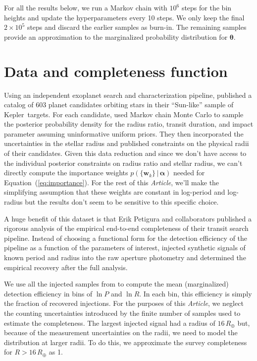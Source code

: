 \documentclass[12pt,preprint]{aastex}
\newcommand{\project}[1]{{\sffamily #1}}
\newcommand{\kepler}{\project{Kepler}}
\newcommand{\paper}{\textsl{Article}}
\newcommand{\Eq}[1]{Equation~(\ref{eq:#1})}
\newcommand{\eq}[1]{\Eq{#1}}
\newcommand{\sectlabel}[1]{\label{sect:#1}}
\newcommand{\bvec}[1]{\ensuremath{\boldsymbol{#1}}}
\newcommand{\ratepar}{{\ensuremath{\theta}}}
\newcommand{\ratepars}{{\ensuremath{\bvec{\ratepar}}}}
\newcommand{\radius}{\ensuremath{R}}
\newcommand{\period}{\ensuremath{P}}
\newcommand{\entry}{{\ensuremath{\bvec{w}}}}
\newcommand{\interim}{{\ensuremath{\bvec{\alpha}}}}
\begin{document}
For all the results below, we run a Markov chain with $10^6$ steps for the bin
heights and update the hyperparameters every 10 steps.
We only keep the final $2 \times 10^5$ steps and discard the earlier samples
as burn-in.
The remaining samples provide an approximation to the marginalized probability
distribution for \ratepars.

\section{Data and completeness function}
\sectlabel{data}

Using an independent exoplanet search and characterization pipeline,
\citet{petigura} published a catalog of 603 planet candidates orbiting stars
in their ``Sun-like'' sample of \kepler\ targets.
For each candidate, \citet{petigura} used Markov chain Monte Carlo to sample
the posterior probability density for the radius ratio, transit duration, and
impact parameter assuming uninformative uniform priors.
They then incorporated the uncertainties in the stellar radius and published
constraints on the physical radii of their candidates.
Given this data reduction and since we don't have access to the individual
posterior constraints on radius ratio and stellar radius, we can't directly
compute the importance weights $p(\{\entry_k\}\,|\,\interim)$ needed for
\eq{importance}.
For the rest of this \paper, we'll make the simplifying assumption that these
weights are constant in log-period and log-radius but the results don't seem
to be sensitive to this specific choice.

A huge benefit of this dataset is that Erik Petigura and collaborators
published a rigorous analysis of the empirical end-to-end completeness of
their transit search pipeline.
Instead of choosing a functional form for the detection efficiency of the
pipeline as a function of the parameters of interest, \citet{petigura}
injected synthetic signals of known period and radius into the raw aperture
photometry and determined the empirical recovery after the full analysis.

We use all the injected samples from \citet{petigura} to compute the mean
(marginalized) detection efficiency in bins of $\ln\period$ and $\ln\radius$.
In each bin, this efficiency is simply the fraction of recovered injections.
For the purposes of this \paper, we neglect the counting uncertainties
introduced by the finite number of samples used to estimate the completeness.
The largest injected signal had a radius of $16\,R_\oplus$ but, because of the
measurement uncertainties on the radii, we need to model the distribution at
larger radii.
To do this, we approximate the survey completeness for $\radius>16\,R_\oplus$
as 1.
\end{document}
